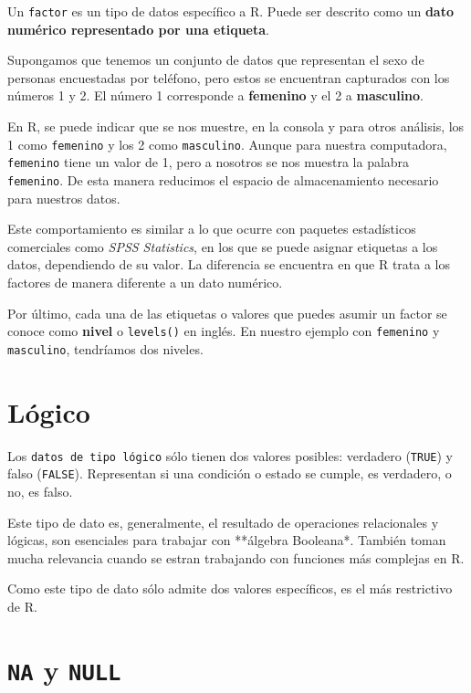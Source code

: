 \documentclass[
]{book}
\begin{document}
Un \texttt{factor} es un tipo de datos específico a R. Puede ser descrito como un \textbf{dato numérico representado por una etiqueta}.

Supongamos que tenemos un conjunto de datos que representan el sexo de personas encuestadas por teléfono, pero estos se encuentran capturados con los números 1 y 2. El número 1 corresponde a \textbf{femenino} y el 2 a \textbf{masculino}.

En R, se puede indicar que se nos muestre, en la consola y para otros análisis, los 1 como \texttt{femenino} y los 2 como \texttt{masculino}. Aunque para nuestra computadora, \texttt{femenino} tiene un valor de 1, pero a nosotros se nos muestra la palabra \texttt{femenino}. De esta manera reducimos el espacio de almacenamiento necesario para nuestros datos.

Este comportamiento es similar a lo que ocurre con paquetes estadísticos comerciales como \emph{SPSS Statistics}, en los que se puede asignar etiquetas a los datos, dependiendo de su valor. La diferencia se encuentra en que R trata a los factores de manera diferente a un dato numérico.

Por último, cada una de las etiquetas o valores que puedes asumir un factor se conoce como \textbf{nivel} o \texttt{levels()} en inglés. En nuestro ejemplo con \texttt{femenino} y \texttt{masculino}, tendríamos dos niveles.

\hypertarget{luxf3gico}{%
\section{Lógico}\label{luxf3gico}}

Los \texttt{datos\ de\ tipo\ lógico} sólo tienen dos valores posibles: verdadero (\texttt{TRUE}) y falso (\texttt{FALSE}). Representan si una condición o estado se cumple, es verdadero, o no, es falso.

Este tipo de dato es, generalmente, el resultado de operaciones relacionales y lógicas, son esenciales para trabajar con **álgebra Booleana*. También toman mucha relevancia cuando se estran trabajando con funciones más complejas en R.

Como este tipo de dato sólo admite dos valores específicos, es el más restrictivo de R.

\hypertarget{na-y-null}{%
\section{\texorpdfstring{\texttt{NA} y \texttt{NULL}}{NA y NULL}}\label{na-y-null}}
\end{document}
